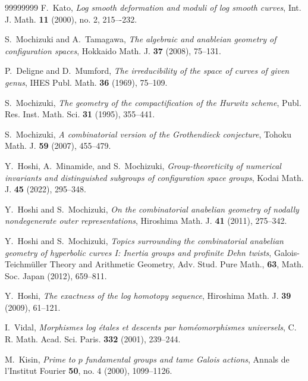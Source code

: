 
\begin{thebibliography}{99999999}
 F.~Kato, \textit{Log smooth deformation and moduli of log smooth curves}, Int. J. Math. \textbf{11} (2000), no. 2, 215–-232.

 S.~Mochizuki and A.~Tamagawa, \textit{The algebraic and anableian geometry of configuration spaces}, Hokkaido Math. J. \textbf{37} (2008), 75--131.

 P.~Deligne and D.~Mumford, \textit{The irreducibility of the space of curves of given genus}, IHES Publ. Math. \textbf{36} (1969), 75--109.

 S.~Mochizuki, \textit{The geometry of the compactification of the Hurwitz scheme}, Publ. Res. Inst. Math. Sci. \textbf{31} (1995), 355--441.

 S.~Mochizuki, \textit{A combinatorial version of the Grothendieck conjecture}, Tohoku Math. J. \textbf{59} (2007), 455--479.

 Y.~Hoshi, A.~Minamide, and S.~Mochizuki, \textit{Group-theoreticity of numerical invariants and distinguished subgroups of configuration space groups}, Kodai Math. J. \textbf{45} (2022), 295--348.

 Y.~Hoshi and S.~Mochizuki, \textit{On the combinatorial anabelian geometry of nodally nondegenerate outer representations}, Hiroshima Math. J. \textbf{41} (2011), 275--342.

 Y.~Hoshi and S.~Mochizuki, \textit{Topics surrounding the combinatorial anabelian geometry of hyperbolic curves I: Inertia groups and profinite Dehn twists}, Galois-Teichm\"{u}ller Theory and Arithmetic Geometry, Adv. Stud. Pure Math., \textbf{63}, Math. Soc. Japan (2012), 659--811.

 Y.~Hoshi, \textit{The exactness of the log homotopy sequence}, Hiroshima Math. J. \textbf{39} (2009), 61--121.

 I.~Vidal, \textit{Morphismes log \'{e}tales et descents par hom\'{e}omorphismes universels}, C. R. Math. Acad. Sci. Paris. \textbf{332} (2001), 239--244.

 M.~Kisin, \textit{Prime to $p$ fundamental groups and tame Galois actions}, Annals de l'Institut Fourier \textbf{50}, no. 4 (2000), 1099--1126.

\end{thebibliography}

